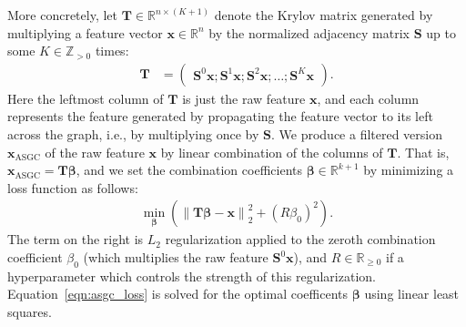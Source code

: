 \documentclass{article}
\newcommand{\norm}[1]{\left\lVert#1\right\rVert}
\newcommand{\Dan}[1]{\textcolor{cyan}{Dan: #1}}
\begin{document}
More concretely, let $\bm{T} \in \mathbb{R}^{n \times (K+1)}$ denote the Krylov matrix generated by multiplying a feature vector $\bm{x} \in \mathbb{R}^n$ by the normalized adjacency matrix $\bm{S}$ up to some $K\in \mathbb{Z}_{>0}$ times:
%
\begin{align}\label{eqn:krylov_matrix}
    \bm{T} &= \begin{pmatrix} \bm{S}^0 \bm{x} ; \bm{S}^1 \bm{x} ; \bm{S}^2 \bm{x} ; \dots ; \bm{S}^K \bm{x} \end{pmatrix}.
\end{align}
%
Here the leftmost column of $\bm{T}$ is just the raw feature $\bm{x}$, and each column represents the feature generated by propagating the feature vector to its left across the graph, i.e., by multiplying once by $\bm{S}$. We produce a filtered version $\bm{x}_\text{ASGC}$ of the raw feature $\bm{x}$ by linear combination of the columns of $\bm{T}$. That is, $\bm{x}_\text{ASGC} = \bm{T} \bm{\beta}$, and we set the combination coefficients $\bm{\beta} \in \mathbb{R}^{k+1}$ by minimizing a loss function as follows:
%
\begin{align} \label{eqn:asgc_loss}
    \min_{\bm{\beta}} \left( \norm{\bm{T}\bm{\beta} - \bm{x}}_2^2 + (R \beta_0)^2 \right) .
\end{align}
%
The term on the right is $L_2$ regularization applied to the zeroth combination coefficient $\beta_0$ (which multiplies the raw feature $\bm{S}^0 \bm{x}$), and $R \in \mathbb{R}_{\geq 0}$ if a hyperparameter which controls the strength of this regularization. 
Equation~\ref{eqn:asgc_loss} is solved for the optimal coefficents $\bm{\beta}$ using linear least squares. 

\end{document}
